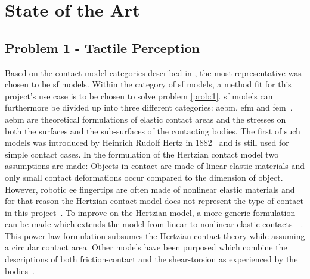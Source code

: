 \chapter{State of the Art}\label{ch:state-of-the-art}

\section{Problem 1 - Tactile Perception}\label{sec:lit-rev-problem-1}

Based on the contact model categories described in , the most representative was chosen to be \gls{sf} models. 
Within the category of \gls{sf} models, a method fit for this project's use case is to be chosen to solve problem \ref{prob:1}. \gls{sf} models can furthermore be divided up into three different categories: \gls{aebm}, \gls{efm} and \gls{fem}~\cite{a-modified-elastic-foundation-contact-model-for-application-in-3d-models-of-the-prosthetic-knee}. \medskip
\gls{aebm} are theoretical formulations of elastic contact areas and the stresses on both the surfaces and the sub-surfaces of the contacting bodies. The first of such models was introduced by Heinrich Rudolf Hertz in 1882~\cite{on-the-contact-of-rigid-elastic-solids-and-on-hardness} and is still used for simple contact cases. In the formulation of the Hertzian contact model two assumptions are made: Objects in contact are made of linear elastic materials and only small contact deformations occur compared to the dimension of object. However, robotic \gls{ee} fingertips are often made of nonlinear elastic materials and for that reason the Hertzian contact model does not represent the type of contact in this project~\cite[Chapter 37]{handbook-of-robotics}. To improve on the Hertzian model, a more generic formulation can be made which extends the model from linear to nonlinear elastic contacts~\cite{modeling-of-contact-mechanics-and-friction-limit-surfaces-for-soft-fingers-in-robotics-with-experimental-results}~\cite{the-haptic-and-perceptional-characteristics-of-an-anthropomorphic-curved-soft-finger-structure}. This power-law formulation subsumes the Hertzian contact theory while assuming a circular contact area. Other models have been purposed which combine the descriptions of both friction-contact and the shear-torsion as experienced by the bodies~\cite{the-sliding-of-robot-fingers-under-combined-torsion-and-shear-loading}. \medskip

